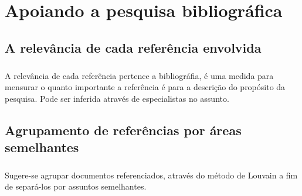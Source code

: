 \chapter{Apoiando a pesquisa bibliográfica}

\section{A relevância de cada referência envolvida}

\paragraph{}
A relevância de cada referência pertence a bibliográfia,  é uma medida para mensurar o quanto importante a referência é para a descrição do propósito da pesquisa. Pode ser inferida através de especialistas no assunto.

\section{Agrupamento de referências por áreas semelhantes}

\paragraph{}
Sugere-se agrupar documentos referenciados, através do método de Louvain a fim de separá-los por assuntos semelhantes.
